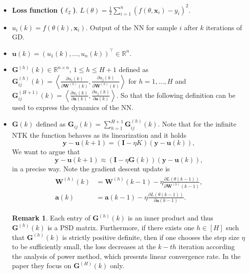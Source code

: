 \documentclass[11pt]{article}
\theoremstyle{plain}
\theoremstyle{definition}
\newtheorem{remark}[thm]{Remark}
\newcommand{\R}{\mathbb{R}}
\begin{document}
\begin{itemize}
\item \textbf{Loss function ($\ell_2$)}. $L(\theta) = \frac{1}{2}\sum_{i=1}^n (f(\theta,\mathbf{x}_i)-y_i)^2$.
\item $u_i(k) = f(\theta(k), \mathbf{x}_i)$. Output of the NN for sample $i$ after $k$ iterations of GD.
\item $\mathbf{u}(k) = (u_1(k), \dots, u_n(k))^\top \in \R^n$. 
\item $\mathbf{G}^{(h)}(k) \in \R^{n\times n}$, $1\leq h \leq H+1$ defined as $\mathbf{G}_{ij}^{(h)}(k) = \left\langle\frac{\partial u_{i}(k)}{\partial \mathbf{W}^{(h)}(k)}, \frac{\partial u_{j}(k)}{\partial \mathbf{W}^{(h)}(k)}\right\rangle$ for $h=1, \ldots, H$ and $\mathbf{G}_{i j}^{(H+1)}(k)=\left\langle\frac{\partial u_{i}(k)}{\partial \mathbf{a}(k)}, \frac{\partial u_{j}(k)}{\partial \mathbf{a}(k)}\right\rangle$. So that the following definition can be used to express the dynamics of the NN.
\item $\mathbf{G}(k)$ defined as $\mathbf{G}_{ij}(k) = \sum_{h=1}^{H+1} \mathbf{G}_{ij}^{(h)}(k)$. Note that for the infinite NTK the function behaves as its linearization and it holds
\[
\mathbf{y}-\mathbf{u}(k+1)=(\mathbf{I}-\eta K)(\mathbf{y}-\mathbf{u}(k)),
\] 
We want to argue that 
\[
    \mathbf{y}-\mathbf{u}(k+1)\approx(\mathbf{I}-\eta \mathbf{G}(k))(\mathbf{y}-\mathbf{u}(k)),
\]
in a precise way. Note the gradient descent update is
\begin{align*} 
\begin{aligned} 
    \mathbf{W}^{(h)}(k) &=\mathbf{W}^{(h)}(k-1)-\eta \frac{\partial L(\theta(k-1))}{\partial \mathbf{W}^{(h)}(k-1)}, \\
    \mathbf{a}(k) &=\mathbf{a}(k-1)-\eta \frac{\partial L(\theta(k-1))}{\partial \mathbf{a}(k-1)}. 
\end{aligned}
\end{align*}

\begin{remark}
    Each entry of $\mathbf{G}^{(h)}(k)$  is an inner product and thus $\mathbf{G}^{(h)}(k)$ is a PSD matrix.  Furthermore, if there exists one $h\in[H]$ such that $\mathbf{G}^{(h)}(k)$ is strictly positive definite, then if one chooses the step size $\eta$ to be sufficiently small, the loss decreases at the $k-th $ iteration according the analysis of power method, which presents linear convergence rate. In the paper they focus on $\mathbf{G}^{(H)}(k)$ only.
\end{remark}


\end{itemize}
\end{document}
